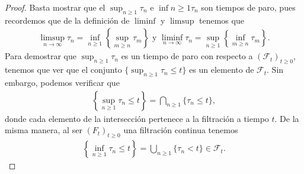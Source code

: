 \begin{proof}
	Basta mostrar que el $\sup_{n \geq 1} \tau_n$ e $\inf{n \geq 1} \tau_n$ son tiempos de paro, pues recordemos que de la definición de $\liminf$ y $\limsup$ tenemos que 
	\begin{align*}
		\limsup_{n \rightarrow \infty} \tau_n = \inf_{n \geq 1} \left\{ \sup_{m \geq n} \tau_m \right\} \text{   y   } \liminf_{n \rightarrow \infty}\tau_n = \sup_{n \geq 1} \left\{ \inf_{m \geq n} \tau_m \right\}.
	\end{align*}
Para demostrar que $\sup_{n \geq 1} \tau_n$ es un tiempo de paro con respecto a $(\mathcal{F}_t)_{t \geq 0}$, tenemos que ver que el conjunto $\{ \sup_{n \geq 1} \tau_n \leq t\}$ es un elemento de $\mathcal{F}_t$. Sin embargo, podemos verificar que
	\begin{align*}
		\left\{ \sup_{n \geq 1} \tau_n \leq t \right\} = \bigcap_{n \geq 1} \{\tau_n \leq t\},
	\end{align*}
	donde cada elemento de la intersección pertenece a la filtración a tiempo $t$. De la misma manera, al ser $(F_t)_{t \geq 0}$ una filtración continua tenemos 
	\begin{align*}
		\left\{ \inf_{n \geq 1} \tau_n \leq t \right\} = \bigcup_{n \geq 1} \{\tau_n < t\} \in \mathcal{F}_t.
	\end{align*}
\end{proof}

